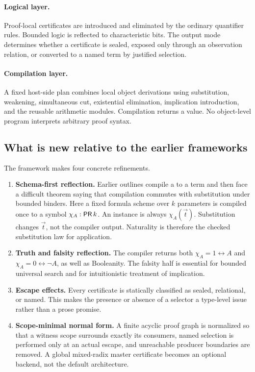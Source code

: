 \paragraph{Logical layer.}
Proof-local certificates are introduced and eliminated by the ordinary
quantifier rules.  Bounded logic is reflected to characteristic bits.  The
output mode determines whether a certificate is sealed, exposed only through
an observation relation, or converted to a named term by justified selection.

\paragraph{Compilation layer.}
A fixed host-side plan combines local object derivations using substitution,
weakening, simultaneous cut, existential elimination, implication
introduction, and the reusable arithmetic modules.  Compilation returns a
 value.  No object-level program interprets arbitrary proof
syntax.

\subsection{What is new relative to the earlier frameworks}

The framework makes four concrete refinements.

\begin{enumerate}[label=\textbf{N\arabic*.}]
\item \textbf{Schema-first reflection.}  Earlier outlines compile a
   to a term and then face a difficult theorem saying that
  compilation commutes with substitution under bounded binders.  Here a fixed
  formula scheme over \(k\) parameters is compiled once to a symbol
  \(\chi_A:\mathsf{PR}\,k\).  An instance is always \(\chi_A(\vec t)\).  Substitution
  changes \(\vec t\), not the compiler output.  Naturality is therefore the
  checked substitution law for application.
\item \textbf{Truth and falsity reflection.}  The compiler returns both
  \(\chi_A=1\leftrightarrow A\) and
  \(\chi_A=0\leftrightarrow\neg A\), as well as Booleanity.  The falsity half
  is essential for bounded universal search and for intuitionistic treatment
  of implication.
\item \textbf{Escape effects.}  Every certificate is statically classified as
  sealed, relational, or named.  This makes the presence or absence of a
  selector a type-level issue rather than a prose promise.
\item \textbf{Scope-minimal normal form.}  A finite acyclic proof graph is
  normalized so that a witness scope surrounds exactly its consumers, named
  selection is performed only at an actual escape, and unreachable producer
  boundaries are removed.  A global mixed-radix master certificate becomes an
  optional backend, not the default architecture.
\end{enumerate}

